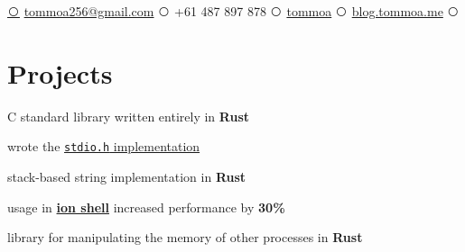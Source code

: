 \documentclass[a4paper]{style}
\def\ci#1{\textcircled{\resizebox{.5em}{!}{#1}}}
\begin{document}
{
\href{mailto:tommoa256@gmail.com}{\ci{\faEnvelope}} {\fontsize{10}{10}\selectfont \href{mailto:tommoa256@gmail.com}{tommoa256@gmail.com}}}
{
\ci{\faPhone}  {\fontsize{10}{10}\selectfont +61 487 897 878} 
}
{
\href{https://github.com/tommoa}{\ci{\faGithub}} {\fontsize{10}{10}\selectfont \href{https://github.com/tommoa}{tommoa}}
}
{
\href{https://blog.tommoa.me/}{\ci{\faFirefox}} {\fontsize{10}{10}\selectfont \href{https://blog.tommoa.me/}{blog.tommoa.me}}
}
{
\href{https://www.linkedin.com/in/tom-almeida-260866165/}{\ci{\faLinkedin}}
}


\begin{minipage}[t]{0.54\textwidth} %



\section{Projects}
    \vspace{7pt}
    \begin{tightitemize}
        \item C standard library written entirely in \textbf{Rust}
        \item wrote the \href{https://github.com/redox-os/relibc/pull/85}{\texttt{stdio.h} implementation}
    \end{tightitemize}
    \vspace{-1pt}
    \begin{tightitemize}
        \item stack-based string implementation in \textbf{Rust}
        \item usage in \href{https://gitlab.redox-os.org/redox-os/ion}{\textbf{ion shell}} increased performance by \textbf{30\%}
    \end{tightitemize}
    \vspace{-1pt}
    \begin{tightitemize}
        \item library for manipulating the memory of other processes in \textbf{Rust}
    \end{tightitemize}


\end{minipage}
\end{document}
